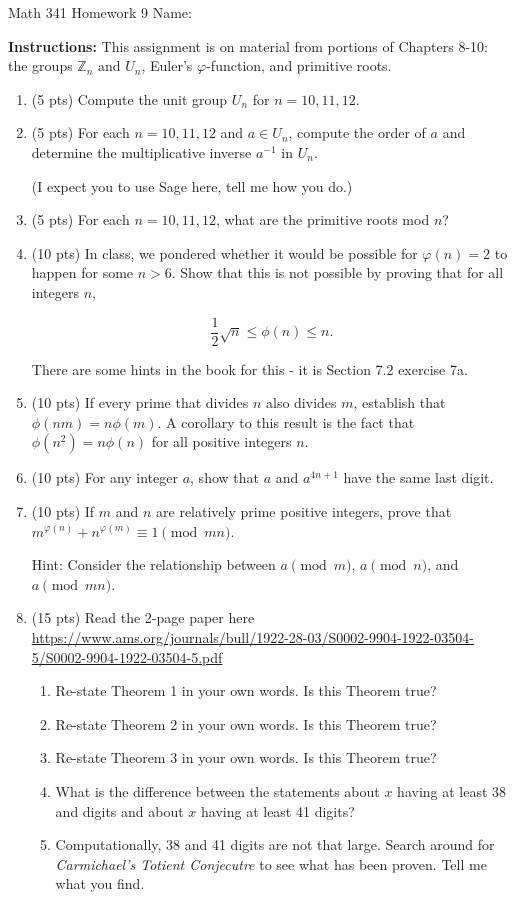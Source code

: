 \documentclass[12pt]{article}
\newcommand{\Z}{\mathbb{Z}}
\begin{document}
	Math 341 Homework 9
	\hfill
	Name: \underline{\hspace*{2in}}
	
	\textbf{Instructions:} This assignment is on material from portions of Chapters 8-10: the groups $\Z_n$ and $U_n$, Euler's $\varphi$-function, and primitive roots.
\begin{enumerate}
	\item (5 pts) Compute the unit group $U_n$ for $n=10,11,12$.
	\vfill
	\item (5 pts) For each $n=10,11,12$ and $a\in U_{n}$, compute the order of $a$ and determine the multiplicative inverse $a^{-1}$ in $U_n$.
	
	(I expect you to use Sage here, tell me how you do.)
	\vfill
	\item (5 pts) For each $n=10,11,12$, what are the primitive roots mod $n$?
	\vfill 
	\newpage
	\item (10 pts) In class, we pondered whether it would be possible for $\varphi(n)=2$ to happen for some $n>6$.  Show that this is not possible by proving that for all integers $n$, 
	
		$$\frac{1}{2}\sqrt n\leq \phi(n)\leq n.$$
		
	There are some hints in the book for this - it is Section 7.2 exercise 7a.
	\vfill
	\item (10 pts) If every prime that divides $n$ also divides $m$, establish that $\phi(nm)=n\phi(m)$.  A corollary to this result is the fact that $\phi(n^2)=n\phi(n)$ for all  positive integers $n$.
	\vfill
	\newpage
	\item (10 pts) For any integer $a$, show that $a$ and $a^{4n+1}$ have the same last digit.
	\vfill
	\item (10 pts) If $m$ and $n$ are relatively prime positive integers, prove that $m^{\varphi(n)}+n^{\varphi(m)}\equiv 1\pmod{mn}$. 
	
	Hint: Consider the relationship between $a\pmod m$, $a\pmod n$, and $a\pmod{mn}$.
	\vfill
	\newpage
	\item (15 pts) Read the 2-page paper here \url{https://www.ams.org/journals/bull/1922-28-03/S0002-9904-1922-03504-5/S0002-9904-1922-03504-5.pdf}
		\begin{enumerate}
			\item Re-state Theorem 1 in your own words.  Is this Theorem true?
			\vfill
			\item Re-state Theorem 2 in your own words. Is this Theorem true?
			\vfill
			\item Re-state Theorem 3 in your own words. Is this Theorem true?
			\vfill
			\item What is the difference between the statements about $x$ having at least 38 and digits and about $x$ having at least 41 digits?
			\vfill
			\item Computationally, 38 and 41 digits are not that large. Search around for \textit{Carmichael's Totient Conjecutre} to see what has been proven. Tell me what you find.
			\vfill
		\end{enumerate}
\end{enumerate}
		
\end{document}
